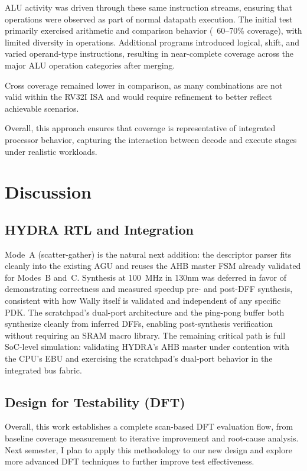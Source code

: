 \documentclass[conference]{IEEEtran}
\begin{document}
        ALU activity was driven through these same instruction streams, ensuring that operations were observed as part of normal datapath execution. The initial test primarily exercised arithmetic and comparison behavior (~60–70\% coverage), with limited diversity in operations. Additional programs introduced logical, shift, and varied operand-type instructions, resulting in near-complete coverage across the major ALU operation categories after merging.
        
        Cross coverage remained lower in comparison, as many combinations are not valid within the RV32I ISA and would require refinement to better reflect achievable scenarios.
        
        Overall, this approach ensures that coverage is representative of integrated processor behavior, capturing the interaction between decode and execute stages under realistic workloads.
\section{Discussion}
    \subsection{HYDRA RTL and Integration}
        Mode~A (scatter-gather) is the natural next addition: the descriptor 
        parser fits cleanly into the existing AGU and reuses the AHB master 
        FSM already validated for Modes~B and~C. Synthesis at 100~MHz in 
        130nm was deferred in favor of demonstrating correctness and measured 
        speedup pre- and post-DFF synthesis, consistent with how Wally itself 
        is validated and independent of any specific PDK. The scratchpad's 
        dual-port architecture and the ping-pong buffer both synthesize 
        cleanly from inferred DFFs, enabling post-synthesis verification 
        without requiring an SRAM macro library. The remaining critical 
        path is full SoC-level simulation: validating HYDRA's AHB master 
        under contention with the CPU's EBU and exercising the scratchpad's 
        dual-port behavior in the integrated bus fabric.
    \subsection{Design for Testability (DFT)}
        Overall, this work establishes a complete scan-based DFT evaluation flow, from baseline coverage measurement to iterative improvement and root-cause analysis. Next semester, I plan to apply this methodology to our new design and explore more advanced DFT techniques to further improve test effectiveness.
\end{document}
